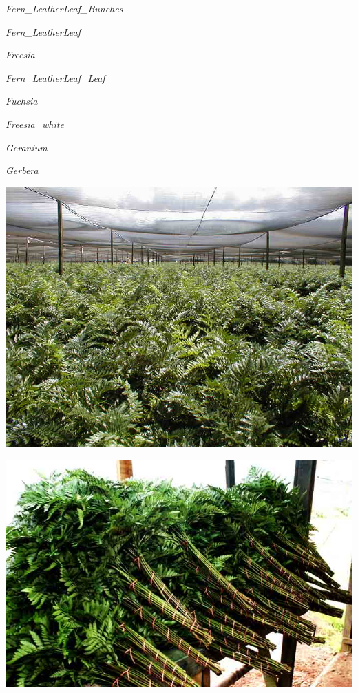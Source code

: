 \documentclass{article}
\begin{document}
\noindent
\vfill
\centerline{{\Large\emph{Fern_LeatherLeaf_Bunches}}}
\vfill
\newpage

\noindent
\vfill
\centerline{{\Large\emph{Fern_LeatherLeaf}}}
\vfill
\newpage

\noindent
\vfill
\centerline{{\Large\emph{Freesia}}}
\vfill
\newpage

\noindent
\vfill
\centerline{{\Large\emph{Fern_LeatherLeaf_Leaf}}}
\vfill
\newpage

\noindent
\vfill
\centerline{{\Large\emph{Fuchsia}}}
\vfill
\newpage

\noindent
\vfill
\centerline{{\Large\emph{Freesia_white}}}
\vfill
\newpage

\noindent
\vfill
\centerline{{\Large\emph{Geranium}}}
\vfill
\newpage

\noindent
\vfill
\centerline{{\Large\emph{Gerbera}}}
\vfill
\newpage

\begin{center}
\includegraphics[height=0.9\textheight, angle=90]{../Fern_LeatherLeaf.jpg}
\end{center}
\newpage

\begin{center}
\includegraphics[height=0.9\textheight, angle=90]{../Fern_LeatherLeaf_Bunches.jpg}
\end{center}
\newpage
\end{document}
